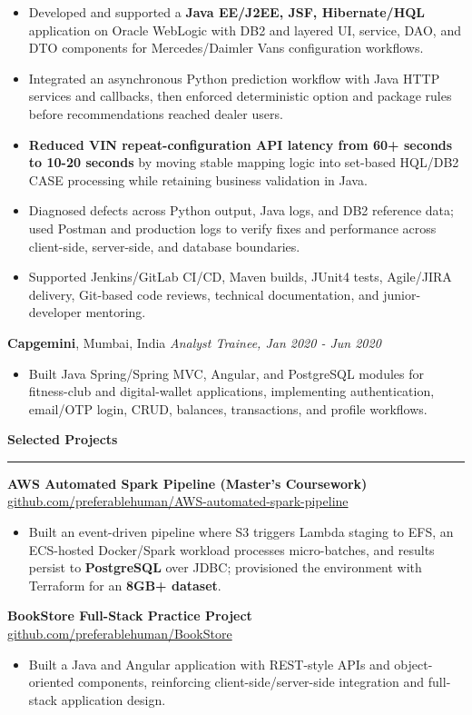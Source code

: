 \documentclass[11pt,letterpaper]{article}
\newcommand{\ressection}[1]{\Needspace{6\baselineskip}\vspace{8pt}\par\textbf{#1}\par\vspace{2pt}\hrule\vspace{5pt}}
\begin{document}
\begin{itemize}
  \item Developed and supported a \textbf{Java EE/J2EE, JSF, Hibernate/HQL} application on Oracle WebLogic with DB2 and layered UI, service, DAO, and DTO components for Mercedes/Daimler Vans configuration workflows.
  \item Integrated an asynchronous Python prediction workflow with Java HTTP services and callbacks, then enforced deterministic option and package rules before recommendations reached dealer users.
  \item \textbf{Reduced VIN repeat-configuration API latency from 60+ seconds to 10-20 seconds} by moving stable mapping logic into set-based HQL/DB2 CASE processing while retaining business validation in Java.
  \item Diagnosed defects across Python output, Java logs, and DB2 reference data; used Postman and production logs to verify fixes and performance across client-side, server-side, and database boundaries.
  \item Supported Jenkins/GitLab CI/CD, Maven builds, JUnit4 tests, Agile/JIRA delivery, Git-based code reviews, technical documentation, and junior-developer mentoring.
\end{itemize}
\textbf{Capgemini}, Mumbai, India \hfill \textit{Analyst Trainee, Jan 2020 - Jun 2020}
\begin{itemize}
  \item Built Java Spring/Spring MVC, Angular, and PostgreSQL modules for fitness-club and digital-wallet applications, implementing authentication, email/OTP login, CRUD, balances, transactions, and profile workflows.
\end{itemize}

\ressection{Selected Projects}
\textbf{AWS Automated Spark Pipeline (Master's Coursework)} \hfill \href{https://github.com/preferablehuman/AWS-automated-spark-pipeline}{github.com/preferablehuman/AWS-automated-spark-pipeline}
\begin{itemize}
  \item Built an event-driven pipeline where S3 triggers Lambda staging to EFS, an ECS-hosted Docker/Spark workload processes micro-batches, and results persist to \textbf{PostgreSQL} over JDBC; provisioned the environment with Terraform for an \textbf{8GB+ dataset}.
\end{itemize}
\vskip 6pt
\textbf{BookStore Full-Stack Practice Project} \hfill \href{https://github.com/preferablehuman/BookStore}{github.com/preferablehuman/BookStore}
\begin{itemize}
  \item Built a Java and Angular application with REST-style APIs and object-oriented components, reinforcing client-side/server-side integration and full-stack application design.
\end{itemize}
\end{document}
